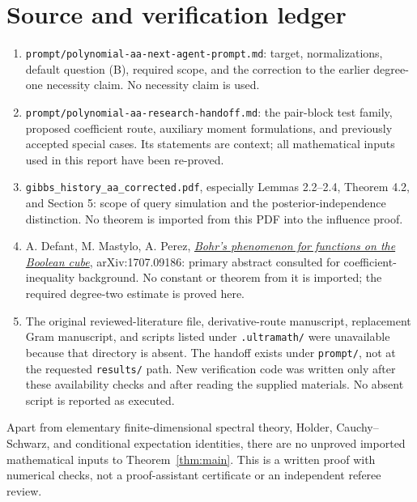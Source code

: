 \documentclass[11pt]{article}
\begin{document}
\section{Source and verification ledger}
\begin{enumerate}
\item \texttt{prompt/polynomial-aa-next-agent-prompt.md}: target,
normalizations, default question (B), required scope, and the correction
to the earlier degree-one necessity claim. No necessity claim is used.
\item \texttt{prompt/polynomial-aa-research-handoff.md}: the pair-block
test family, proposed coefficient route, auxiliary moment formulations,
and previously accepted special cases. Its statements are context;
all mathematical inputs used in this report have been re-proved.
\item \texttt{gibbs\_history\_aa\_corrected.pdf}, especially Lemmas
2.2--2.4, Theorem 4.2, and Section 5: scope of query simulation and
the posterior-independence distinction. No theorem is imported from
this PDF into the influence proof.
\item A. Defant, M. Mastylo, A. Perez,
\href{https://arxiv.org/abs/1707.09186}{\emph{Bohr's phenomenon for
functions on the Boolean cube}}, arXiv:1707.09186: primary abstract
consulted for coefficient-inequality background. No constant or theorem
from it is imported; the required degree-two estimate is proved here.
\item The original reviewed-literature file, derivative-route manuscript,
replacement Gram manuscript, and scripts listed under \texttt{.ultramath/}
were unavailable because that directory is absent. The handoff exists
under \texttt{prompt/}, not at the requested \texttt{results/} path.
New verification code was written only after these availability checks
and after reading the supplied materials. No absent script is reported
as executed.
\end{enumerate}
Apart from elementary finite-dimensional spectral theory, Holder,
Cauchy--Schwarz, and conditional expectation identities, there are no
unproved imported mathematical inputs to Theorem~\ref{thm:main}.
This is a written proof with numerical checks, not a proof-assistant
certificate or an independent referee review.
\end{document}
